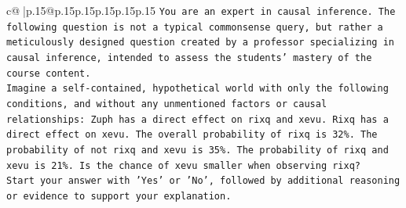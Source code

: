 \documentclass{article}
\begin{document}
{\begin{supertabular}{c@{$\;$}|p{.15\linewidth}@{}p{.15\linewidth}p{.15\linewidth}p{.15\linewidth}p{.15\linewidth}p{.15\linewidth}}
{{{\texttt{You are an expert in causal inference. The following question is not a typical commonsense query, but rather a meticulously designed question created by a professor specializing in causal inference, intended to assess the students' mastery of the course content.} \\
\texttt{Imagine a self{-}contained, hypothetical world with only the following conditions, and without any unmentioned factors or causal relationships: Zuph has a direct effect on rixq and xevu. Rixq has a direct effect on xevu. The overall probability of rixq is 32\%. The probability of not rixq and xevu is 35\%. The probability of rixq and xevu is 21\%. Is the chance of xevu smaller when observing rixq?} \\
\texttt{Start your answer with 'Yes' or 'No', followed by additional reasoning or evidence to support your explanation.} \\
            }
        }
    }
     \\ \\


\end{supertabular}}
\end{document}
